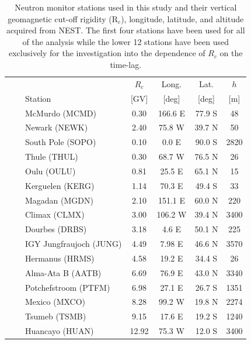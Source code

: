 \begin{table}[ht!]
	\begin{center}

	\caption{Neutron monitor stations used in this study and their vertical geomagnetic cut-off rigidity (R$_c$), longitude, latitude, and altitude acquired from NEST. The first four stations have been used for all of the analysis while the lower 12 stations have been used exclusively for the investigation into the dependence of $R_c$ on the time-lag.}
	\label{tab:NM_stns}
	
	\begin{tabular}{l l l c c c c}
		\hline
		& &  & $R_c$  & Long. & Lat.  & $h$  \\
		& & Station & [GV] & [deg] & [deg] & [m]  \\
		\hline
		\parbox[t]{2mm}{} &
		\parbox[t]{2mm}{}
		& McMurdo (MCMD) & 0.30 & 166.6 E & 77.9 S & 48 \\
		& & Newark (NEWK) & 2.40 & 75.8 W & 39.7 N & 50  \\
		& & South Pole (SOPO) & 0.10 & 0.0 E & 90.0 S & 2820\\
		& & Thule (THUL) & 0.30 & 68.7 W & 76.5 N & 26 \\
		\hline
		\parbox[t]{2mm}{} &
		\parbox[t]{2mm}{}
		& Oulu (OULU) & 0.81 & 25.5 E & 65.1 N & 15 \\
		& & Kerguelen (KERG) & 1.14 & 70.3 E & 49.4 S & 33 \\
		& & Magadan (MGDN) & 2.10 & 151.1 E & 60.0 N & 220 \\
		& & Climax (CLMX) & 3.00 & 106.2 W & 39.4 N & 3400  \\
		& & Dourbes (DRBS) & 3.18 & 4.6 E & 50.1 N & 225 \\
		& & IGY Jungfraujoch (JUNG) & 4.49 & 7.98 E & 46.6 N & 3570 \\
		& & Hermanus (HRMS) & 4.58 & 19.2 E & 34.4 S & 26 \\
		& & Alma-Ata B (AATB) & 6.69 & 76.9 E & 43.0 N &  3340 \\
		& & Potchefstroom (PTFM) & 6.98 &  27.1 E &  26.7 S &  1351 \\
		& & Mexico (MXCO) & 8.28 & 99.2 W & 19.8 N & 2274 \\
		& & Tsumeb (TSMB) & 9.15 & 17.6 E & 19.2 S &  1240 \\
		& & Huancayo (HUAN) & 12.92 &  75.3 W &  12.0 S &  3400 \\
		\hline
		
	\end{tabular}
	\end{center}
\end{table}



